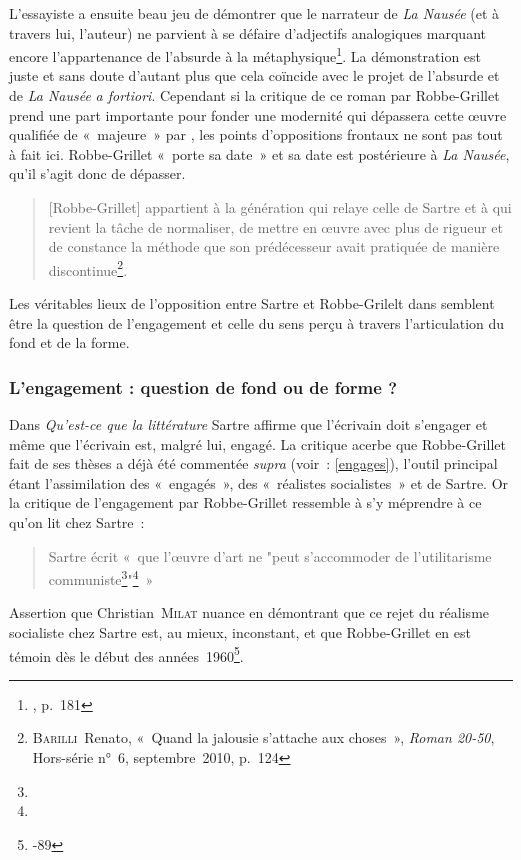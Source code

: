 \documentclass[12pt, a4paper]{article}
\begin{document}
L'essayiste a ensuite beau jeu de démontrer que le narrateur de \textit{La Nausée} (et à travers lui, l'auteur) ne parvient à se défaire d'adjectifs analogiques marquant encore l'appartenance de l'absurde à la métaphysique\footnote{, p.~181}. La démonstration est juste et sans doute d'autant plus que cela coïncide avec le projet de l'absurde et de \textit{La Nausée} \textit{a fortiori}. Cependant si la critique de ce roman par Robbe-Grillet prend une part importante pour fonder une modernité qui dépassera cette œuvre qualifiée de «~majeure~» par \robbe, les points d'oppositions frontaux ne sont pas tout à fait ici. Robbe-Grillet «~porte sa date~» et sa date est postérieure à \textit{La Nausée}, qu'il s'agit donc de dépasser.
\begin{quote}
     [Robbe-Grillet] appartient à la génération qui relaye celle de Sartre et à qui revient la tâche de normaliser, de mettre en œuvre avec plus de rigueur et de constance la méthode que son prédécesseur avait pratiquée de manière discontinue\footnote{\textsc{Barilli}~Renato, «~Quand la jalousie s'attache aux choses~», \textit{Roman 20-50}, Hors-série n°~6, septembre~2010, p.~124}.
\end{quote}


Les véritables lieux de l'opposition entre Sartre et Robbe-Grilelt dans \punr{} semblent être la question de l'engagement et celle du sens perçu à travers l'articulation du fond et de la forme.


\subsubsection{L'engagement : question de fond ou de forme ?}


Dans \textit{Qu'est-ce que la littérature} Sartre affirme que l'écrivain doit s'engager et même que l'écrivain est, malgré lui, engagé. La critique acerbe que Robbe-Grillet fait de ses thèses a déjà été commentée \textit{supra} (voir~: \ref{engages}), l'outil principal étant l'assimilation des «~engagés~», des «~réalistes socialistes~» et de Sartre. Or la critique de l'engagement par Robbe-Grillet ressemble à s'y méprendre à ce qu'on lit chez Sartre~:
\begin{quote}
    Sartre écrit «~que l'œuvre d'art ne "peut s'accommoder de l'utilitarisme communiste\footnote{}"\footnote{}~»
\end{quote}
Assertion que Christian~\textsc{Milat} nuance en démontrant que ce rejet du réalisme socialiste chez Sartre est, au mieux, inconstant, et que Robbe-Grillet en est témoin dès le début des années~1960\footnote{-89}.
\end{document}
